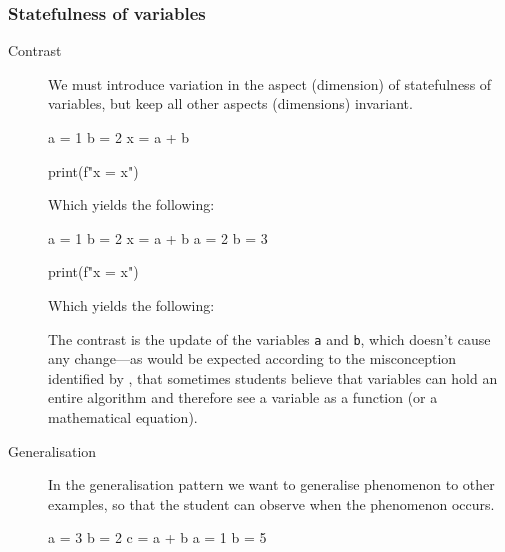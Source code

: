 \subsubsection{Statefulness of variables}

\begin{description}
  \item [Contrast] We must introduce variation in the aspect (dimension) of 
    statefulness of variables, but keep all other aspects (dimensions) 
    invariant.

    \begin{minipage}[t]{0.45\columnwidth}
      \begin{pyblock}[varstateC1]
a = 1
b = 2
x = a + b



print(f"x = {x}")
      \end{pyblock}

      \vspace{0.5em}
      Which yields the following:
      \printpythontex[verbatim]
    \end{minipage}
    \hfill
    \begin{minipage}[t]{0.45\columnwidth}
      \begin{pyblock}[varstateC2][highlightlines={4-5}]
a = 1
b = 2
x = a + b
a = 2
b = 3

print(f"x = {x}")
      \end{pyblock}

      \vspace{0.5em}
      Which yields the following:
      \printpythontex[verbatim]
    \end{minipage}

    The contrast is the update of the variables \texttt{a} and 
    \texttt{b}, which doesn't cause any change---as would be 
    expected according to the misconception identified by
    \textcite{Kohn2017VariableEvaluation,Plass2015Variables,Doukakis2007}, that 
    sometimes students believe that variables can hold an entire algorithm and 
    therefore see a variable as a function (or a mathematical equation).

    \item [Generalisation] In the generalisation pattern we want to generalise 
      phenomenon to other examples, so that the student can observe when the 
      phenomenon occurs.
    
      \begin{minipage}[t]{0.45\columnwidth}
        \begin{pyblock}[varstateG1]
a = 3
b = 2
c = a + b
a = 1
b = 5


\end{pyblock}
\end{minipage}
\end{description}
